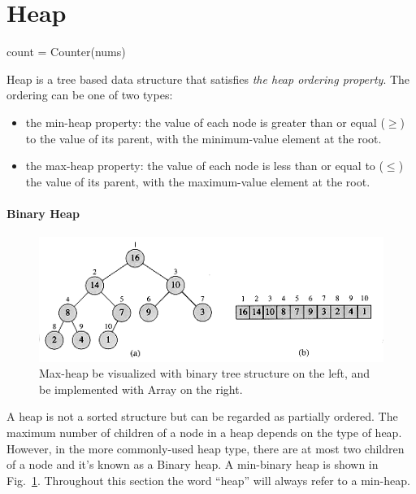 \documentclass[../main.tex]{subfiles}
\begin{document}
\section{Heap}
    count = Counter(nums)

Heap is a tree based data structure that satisfies \textit{the heap ordering property}. The ordering can be one of two types:
\begin{itemize}
    \item the min-heap property: the value of each node is greater than or equal ($\geq$) to the value of its parent, with the minimum-value element at the root.
\item the max-heap property: the value of each node is less than or equal to ($\leq$) the value of its parent, with the maximum-value element at the root. 
\end{itemize}
\paragraph{Binary Heap}
\begin{figure}[h!]
    \centering
    \includegraphics[width = 0.98\columnwidth]{fig/binary_tree.png}
    \caption{Max-heap be visualized with binary tree structure on the left, and be implemented with Array on the right.}
    \label{fig:max-heap-1}
\end{figure}
A heap is not a sorted structure but can be regarded as partially ordered. The maximum number of children of a node in a heap depends on the type of heap. However, in the more commonly-used heap type, there are at most two children of a node and it's known as a Binary heap. A min-binary heap is shown in Fig.~\ref{fig:max-heap-1}. Throughout this section the word ``heap'' will always refer to a min-heap. 
\end{document}
